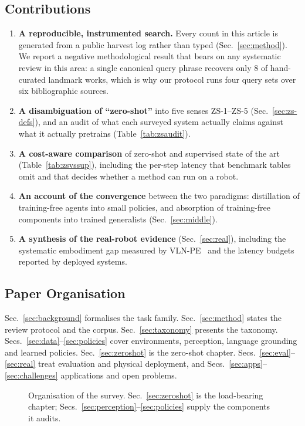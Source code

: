 \documentclass[journal]{IEEEtran}
\begin{document}
\subsection{Contributions}
\begin{enumerate}
\item \textbf{A reproducible, instrumented search.} Every count in this
article is generated from a public harvest log rather than typed
(Sec.~\ref{sec:method}). We report a negative methodological result that
bears on any systematic review in this area: a single canonical query
phrase recovers only 8 of \SeedTotal{} hand-curated landmark works, which
is why our protocol runs four query sets over six bibliographic sources.
\item \textbf{A disambiguation of ``zero-shot''} into five senses ZS-1--ZS-5
(Sec.~\ref{sec:zs-defs}), and an audit of what each surveyed system
actually claims against what it actually pretrains
(Table~\ref{tab:zsaudit}).
\item \textbf{A cost-aware comparison} of zero-shot and supervised state of
the art (Table~\ref{tab:zsvssup}), including the per-step latency that
benchmark tables omit and that decides whether a method can run on a robot.
\item \textbf{An account of the convergence} between the two paradigms:
distillation of training-free agents into small policies, and absorption of
training-free components into trained generalists
(Sec.~\ref{sec:middle}).
\item \textbf{A synthesis of the real-robot evidence}
(Sec.~\ref{sec:real}), including the systematic embodiment gap measured by
VLN-PE~\cite{wang2025rethinking} and the latency budgets reported by
deployed systems.
\end{enumerate}

\subsection{Paper Organisation}
Sec.~\ref{sec:background} formalises the task family.
Sec.~\ref{sec:method} states the review protocol and the corpus.
Sec.~\ref{sec:taxonomy} presents the taxonomy.
Secs.~\ref{sec:data}--\ref{sec:policies} cover environments, perception,
language grounding and learned policies.
Sec.~\ref{sec:zeroshot} is the zero-shot chapter.
Secs.~\ref{sec:eval}--\ref{sec:real} treat evaluation and physical
deployment, and Secs.~\ref{sec:apps}--\ref{sec:challenges} applications and
open problems.

\begin{figure}[!t]
  \centering
  \resizebox{\columnwidth}{!}{}
  \caption{Organisation of the survey. Sec.~\ref{sec:zeroshot} is the
  load-bearing chapter; Secs.~\ref{sec:perception}--\ref{sec:policies}
  supply the components it audits.}
  \label{fig:organisation}
\end{figure}
\end{document}
